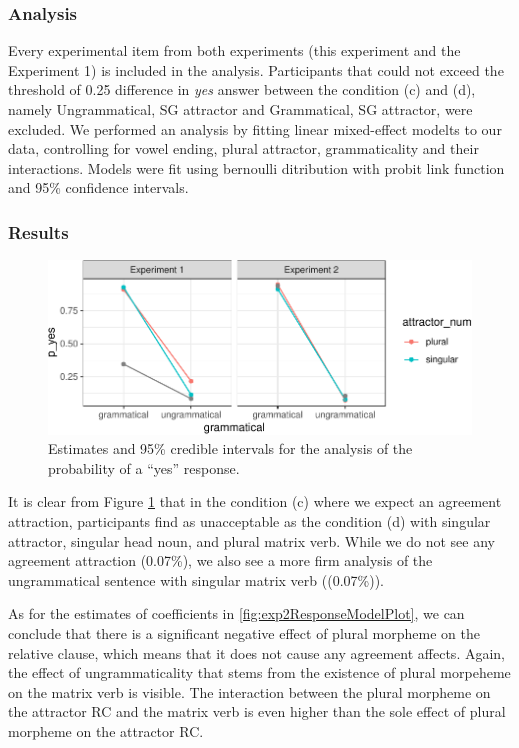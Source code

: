 \documentclass[doc]{apa6}
\begin{document}
\hypertarget{analysis-1}{%
\subsubsection{Analysis}\label{analysis-1}}

Every experimental item from both experiments (this experiment and the Experiment 1) is included in the analysis. Participants that could not exceed the threshold of 0.25 difference in \emph{yes} answer between the condition (c) and (d), namely Ungrammatical, SG attractor and Grammatical, SG attractor, were excluded. We performed an analysis by fitting linear mixed-effect modelts to our data, controlling for vowel ending, plural attractor, grammaticality and their interactions. Models were fit using bernoulli ditribution with probit link function and 95\% confidence intervals.

\hypertarget{results-1}{%
\subsubsection{Results}\label{results-1}}

\begin{figure}
\centering
\includegraphics{AgreementAttraction_files/figure-latex/exp2AvgResponse-1.pdf}
\caption{\label{fig:exp2AvgResponse}Estimates and 95\% credible intervals for the analysis of the probability of a \enquote{yes} response.}
\end{figure}

It is clear from Figure \ref{fig:exp2AvgResponse} that in the condition (c) where we expect an agreement attraction, participants find as unacceptable as the condition (d) with singular attractor, singular head noun, and plural matrix verb. While we do not see any agreement attraction (0.07\%), we also see a more firm analysis of the ungrammatical sentence with singular matrix verb ((0.07\%)).

As for the estimates of coefficients in \ref{fig:exp2ResponseModelPlot}, we can conclude that there is a significant negative effect of plural morpheme on the relative clause, which means that it does not cause any agreement affects. Again, the effect of ungrammaticality that stems from the existence of plural morpeheme on the matrix verb is visible. The interaction between the plural morpheme on the attractor RC and the matrix verb is even higher than the sole effect of plural morpheme on the attractor RC.
\end{document}

